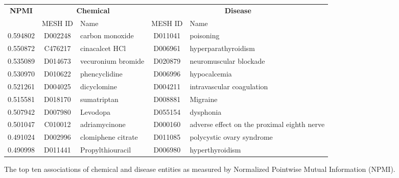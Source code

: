 \documentclass[10pt, oneside]{article}
\begin{document}
\begin{figure}[h]
\begin{center}
\fontsize{9}{11}\selectfont
\begin{tabular}{|*{2}{c|}p{4.5cm}|c|p{4.5cm}|}\hline
 \multirow{2}{*}{\textbf{NPMI}} & \multicolumn{2}{c|}{\textbf{Chemical}} & \multicolumn{2}{c|}{\textbf{Disease}} \\ \cline{2-5}
  & MESH ID   & Name                      & MESH ID   & Name                         \\ \hline 
 0.594802 & D002248   & carbon monoxide    & D011041   & poisoning                                   \\ \hline
 0.550872 & C476217   & cinacalcet HCl     & D006961   & hyperparathyroidism                         \\ \hline
 0.535089 & D014673   & vecuronium bromide & D020879   & neuromuscular blockade                      \\ \hline
 0.530970 & D010622   & phencyclidine      & D006996   & hypocalcemia                                \\ \hline
 0.521261 & D004025   & dicyclomine        & D004211   & intravascular coagulation                   \\ \hline
 0.515581 & D018170   & sumatriptan        & D008881   & Migraine                                    \\ \hline
 0.507942 & D007980   & Levodopa           & D055154   & dysphonia                                   \\ \hline
 0.501047 & C010012   & adriamycinone      & D000160   & adverse effect on the proximal eighth nerve \\ \hline
 0.491024 & D002996   & clomiphene citrate & D011085   & polycystic ovary syndrome                   \\ \hline
 0.490998 & D011441   & Propylthiouracil   & D006980   & hyperthyroidism                             \\ \hline
\end{tabular}
\caption{\label{fig:npmi} The top ten associations of chemical and disease entities as measured by Normalized Pointwise Mutual Information (NPMI).}
\end{center}
\end{figure}
\end{document}
